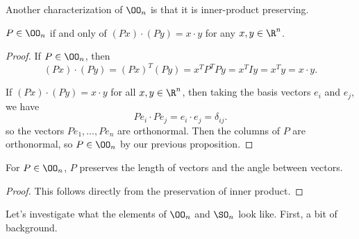 Another characterization of $\OO_n$ is that it is inner-product preserving.

\begin{proposition}
	$P \in \OO_n$ if and only of $(Px) \cdot (Py) = x \cdot y$ for any $x, y \in \R^n$.
\end{proposition}
\begin{proof}
	If $P \in \OO_n$, then 
	$$
	(Px) \cdot (Py) = (Px)^T (Py) = x^T P^T P y = x^T I y = x^Ty = x \cdot y.
	$$

	If $(Px) \cdot (Py) = x \cdot y$ for all $x, y \in \R^n$, then taking the basis vectors $e_i$ and $e_j$, we have
	$$
	Pe_i \cdot Pe_j = e_i \cdot e_j = \delta_{ij}.
	$$
	so the vectors $Pe_1,\dots, Pe_n$ are orthonormal. Then the columns of $P$ are orthonormal, so $P \in \OO_n$ by our previous proposition. 
\end{proof}

\begin{corollary}
	For $P \in \OO_n$, $P$ preserves the length of vectors and the angle between vectors.
\end{corollary}
\begin{proof}
	This follows directly from the preservation of inner product.
\end{proof}

Let's investigate what the elements of $\OO_n$ and $\SO_n$ look like. First, a bit of background.

